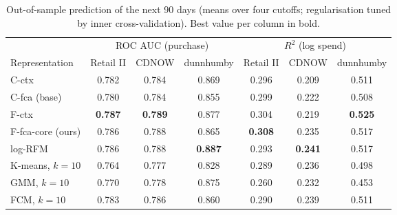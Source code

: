 \begin{table}[t]
\centering\footnotesize
\caption{Out-of-sample prediction of the next 90 days (means over four cutoffs; regularisation tuned by inner cross-validation). Best value per column in bold.}
\label{tab:prediction}
\begin{tabular}{lcccccc}
\toprule
 & \multicolumn{3}{c}{ROC AUC (purchase)} & \multicolumn{3}{c}{$R^2$ (log spend)} \\
\cmidrule(lr){2-4}\cmidrule(lr){5-7}
Representation & Retail II & CDNOW & dunnhumby & Retail II & CDNOW & dunnhumby \\
\midrule
C-ctx & 0.782 & 0.784 & 0.869 & 0.296 & 0.209 & 0.511 \\
C-fca (base) & 0.780 & 0.784 & 0.855 & 0.299 & 0.222 & 0.508 \\
F-ctx & \textbf{0.787} & \textbf{0.789} & 0.877 & 0.304 & 0.219 & \textbf{0.525} \\
F-fca-core (ours) & 0.786 & 0.788 & 0.865 & \textbf{0.308} & 0.235 & 0.517 \\
log-RFM & 0.786 & 0.788 & \textbf{0.887} & 0.293 & \textbf{0.241} & 0.517 \\
K-means, $k{=}10$ & 0.764 & 0.777 & 0.828 & 0.289 & 0.236 & 0.498 \\
GMM, $k{=}10$ & 0.770 & 0.778 & 0.875 & 0.260 & 0.232 & 0.453 \\
FCM, $k{=}10$ & 0.783 & 0.786 & 0.860 & 0.290 & 0.239 & 0.511 \\
\bottomrule
\end{tabular}
\end{table}
